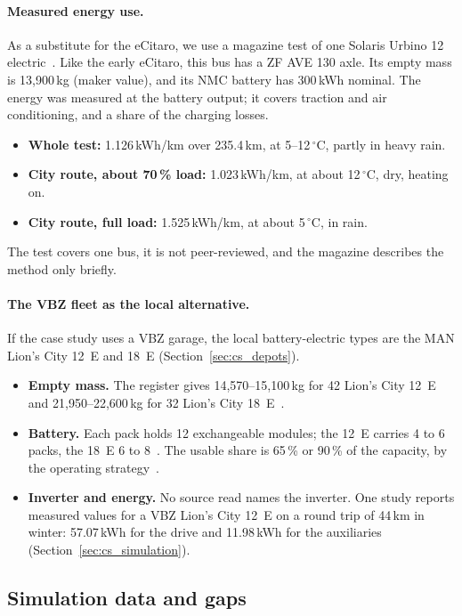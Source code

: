 \documentclass[11pt,a4paper]{article}
\theoremstyle{plain}
\theoremstyle{definition}
\theoremstyle{remark}
\begin{document}
\paragraph{Measured energy use.}
As a substitute for the eCitaro, we use a magazine test of one Solaris Urbino 12 electric~\cite[p.~11]{Tschakert2020}.
Like the early eCitaro, this bus has a ZF AVE 130 axle.
Its empty mass is 13,900\,kg (maker value), and its NMC battery has 300\,kWh nominal.
The energy was measured at the battery output; it covers traction and air conditioning, and a share of the charging losses.
\begin{itemize}
  \item \textbf{Whole test:} 1.126\,kWh/km over 235.4\,km, at 5--12\,$^\circ$C, partly in heavy rain.
  \item \textbf{City route, about 70\,\% load:} 1.023\,kWh/km, at about 12\,$^\circ$C, dry, heating on.
  \item \textbf{City route, full load:} 1.525\,kWh/km, at about 5\,$^\circ$C, in rain.
\end{itemize}
The test covers one bus, it is not peer-reviewed, and the magazine describes the method only briefly.

\paragraph{The VBZ fleet as the local alternative.}
If the case study uses a VBZ garage, the local battery-electric types are the MAN Lion's City 12~E and 18~E (Section~\ref{sec:cs_depots}).
\begin{itemize}
  \item \textbf{Empty mass.} The register gives 14,570--15,100\,kg for 42 Lion's City 12~E and 21,950--22,600\,kg for 32 Lion's City 18~E~\cite{ASTRA2026Stock}.
  \item \textbf{Battery.} Each pack holds 12 exchangeable modules; the 12~E carries 4 to 6 packs, the 18~E 6 to 8~\cite[pp.~9--10]{MAN2026LionsCityE}.
    The usable share is 65\,\% or 90\,\% of the capacity, by the operating strategy~\cite[p.~9]{MAN2026LionsCityE}.
  \item \textbf{Inverter and energy.} No source read names the inverter.
    One study reports measured values for a VBZ Lion's City 12~E on a round trip of 44\,km in winter: 57.07\,kWh for the drive and 11.98\,kWh for the auxiliaries~\cite[Table~1]{Konzept2025} (Section~\ref{sec:cs_simulation}).
\end{itemize}

\subsection{Simulation data and gaps}
\end{document}
